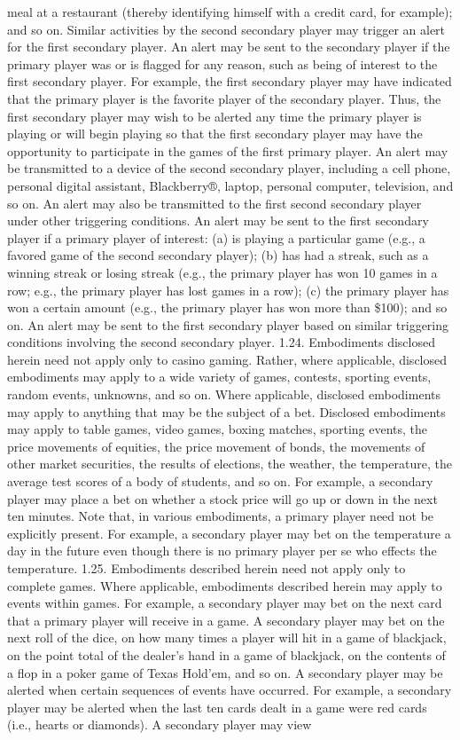 \documentclass[11pt,a4paper]{article}
\begin{document}
meal at a restaurant (thereby identifying himself with a credit card, for example); and so on. Similar activities by the second secondary player may trigger an alert for the first secondary player. An alert may be sent to the secondary player if the primary player was or is flagged for any reason, such as being of interest to the first secondary player. For example, the first secondary player may have indicated that the primary player is the favorite player of the secondary player. Thus, the first secondary player may wish to be alerted any time the primary player is playing or will begin playing so that the first secondary player may have the opportunity to participate in the games of the first primary player. An alert may be transmitted to a device of the second secondary player, including a cell phone, personal digital assistant, Blackberry®, laptop, personal computer, television, and so on. An alert may also be transmitted to the first second secondary player under other triggering conditions. An alert may be sent to the first secondary player if a primary player of interest: (a) is playing a particular game (e.g., a favored game of the second secondary player); (b) has had a streak, such as a winning streak or losing streak (e.g., the primary player has won 10 games in a row; e.g., the primary player has lost games in a row); (c) the primary player has won a certain amount (e.g., the primary player has won more than \$100); and so on. An alert may be sent to the first secondary player based on similar triggering conditions involving the second secondary player. 1.24. Embodiments disclosed herein need not apply only to casino gaming. Rather, where applicable, disclosed embodiments may apply to a wide variety of games, contests, sporting events, random events, unknowns, and so on. Where applicable, disclosed embodiments may apply to anything that may be the subject of a bet. Disclosed embodiments may apply to table games, video games, boxing matches, sporting events, the price movements of equities, the price movement of bonds, the movements of other market securities, the results of elections, the weather, the temperature, the average test scores of a body of students, and so on. For example, a secondary player may place a bet on whether a stock price will go up or down in the next ten minutes. Note that, in various embodiments, a primary player need not be explicitly present. For example, a secondary player may bet on the temperature a day in the future even though there is no primary player per se who effects the temperature. 1.25. Embodiments described herein need not apply only to complete games. Where applicable, embodiments described herein may apply to events within games. For example, a secondary player may bet on the next card that a primary player will receive in a game. A secondary player may bet on the next roll of the dice, on how many times a player will hit in a game of blackjack, on the point total of the dealer's hand in a game of blackjack, on the contents of a flop in a poker game of Texas Hold'em, and so on. A secondary player may be alerted when certain sequences of events have occurred. For example, a secondary player may be alerted when the last ten cards dealt in a game were red cards (i.e., hearts or diamonds). A secondary player may view 
\end{document}
